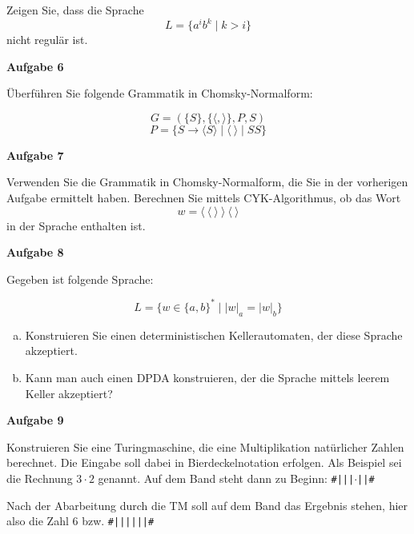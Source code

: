 \documentclass[a4paper,12pt]{article}
\newcommand{\Aufgabe}[1]{
	{
		\vspace*{0.5cm}
		\textsf{\textbf{Aufgabe #1}}
		\vspace*{0.2cm}
		
	}
}
\begin{document}
	Zeigen Sie, dass die Sprache
	$$L=\{a^ib^k \mid k > i\}$$
	nicht regulär ist.
	
	\Aufgabe{6}
	
	Überführen Sie folgende Grammatik in Chomsky-Normalform:
	
	$$G=(\{S\}, \{\langle,\rangle\},P,S)$$
	$$P=\{S \rightarrow \langle S\rangle \mid \langle\:\rangle \mid SS\}$$
	
	\Aufgabe{7}
	
	Verwenden Sie die Grammatik in Chomsky-Normalform, die Sie in der vorherigen Aufgabe ermittelt haben. Berechnen Sie mittels CYK-Algorithmus, ob das Wort
	$$w=\langle\:\langle\:\rangle\:\rangle\:\langle\:\rangle$$ in der Sprache enthalten ist.
	
	\Aufgabe{8}
	
	Gegeben ist folgende Sprache:
	
	$$L=\{w \in \{a,b\}^* \mid |w|_a=|w|_b\}$$
	
	\begin{enumerate}[a)]
		\item Konstruieren Sie einen deterministischen Kellerautomaten, der diese Sprache akzeptiert.
		\item Kann man auch einen DPDA konstruieren, der die Sprache mittels leerem Keller akzeptiert?
	\end{enumerate}
	
	\Aufgabe{9}
	
	Konstruieren Sie eine Turingmaschine, die eine Multiplikation natürlicher Zahlen berechnet. Die Eingabe soll dabei in Bierdeckelnotation erfolgen. Als Beispiel sei die Rechnung $3\cdot2$ genannt. Auf dem Band steht dann zu Beginn: \texttt{\#|||$\cdot$||\#}
	
	Nach der Abarbeitung durch die TM soll auf dem Band das Ergebnis stehen, hier also die Zahl $6$ bzw. \texttt{\#||||||\#}
\end{document}
